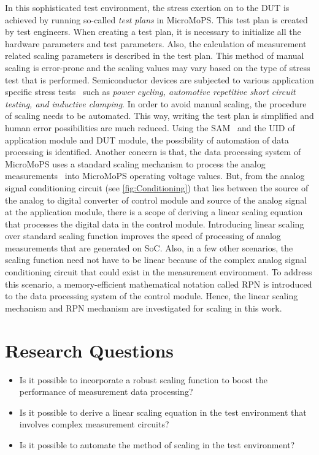 In this sophisticated test environment, the stress exertion on to the \gls{DUT} is achieved by running so-called \emph{test plans} in MicroMoPS. 
This test plan\cite{Plankensteiner2015} is created by test engineers.
When creating a test plan, it is necessary to initialize all the hardware parameters and test parameters. 
Also, the calculation of measurement related scaling parameters is described in the test plan. 
This method of manual scaling is error-prone and the scaling values may vary based on the type of stress test that is performed. 
Semiconductor devices are subjected to various application specific stress tests~\cite{Sleik2016} such as \emph{power cycling, automotive repetitive short circuit testing, and inductive clamping}. 
In order to avoid manual scaling, the procedure of scaling needs to be automated. 
This way, writing the test plan is simplified and human error possibilities are much reduced.
Using the \gls{SAM}~\cite{Steinwender2016} and the \gls{UID} of application module and \gls{DUT} module, the possibility of automation of data processing is identified.
Another concern is that, the data processing system of MicroMoPS uses a standard scaling mechanism to process the analog measurements~\cite{Sleik2016} into MicroMoPS operating voltage values.
But, from the analog signal conditioning circuit (see \cref{fig:Conditioning}) that lies between the source of the analog to digital converter of control module and source of the analog signal at the application module, there is a scope of deriving a linear scaling equation that processes the digital data in the control module. Introducing linear scaling over standard scaling function improves the speed of processing of analog measurements that are generated on \gls{SoC}.
Also, in a few other scenarios, the scaling function need not have to be linear because of the complex analog signal conditioning circuit that could exist in the measurement environment. To address this scenario, a memory-efficient mathematical notation called \acrshort{RPN} is introduced to the data processing system of the control module.
Hence, the linear scaling mechanism and \acrshort{RPN} mechanism are investigated for scaling in this work.
 

\section{Research Questions}\label{sec:RQs}
\begin{itemize}
	\item Is it possible to incorporate a robust scaling function to boost the performance of measurement data processing?
	\item Is it possible to derive a linear scaling equation in the test environment that involves complex measurement circuits?
	\item Is it possible to automate the method of scaling in the test environment?
\end{itemize}

